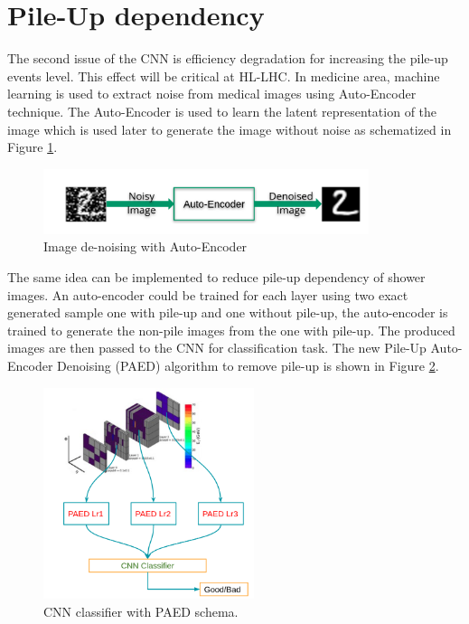 \section{Pile-Up dependency}
The second issue of the CNN is efficiency degradation for increasing the pile-up events level. This effect will be critical at HL-LHC. In medicine area, machine learning is used to extract noise from medical images using Auto-Encoder technique. The Auto-Encoder is used to learn the latent representation of the image which is used later to generate the image without noise as schematized in Figure \ref{fig:Adx3:AutoEncoder}.

\begin{figure}[H]
    \centering
    \includegraphics[width=0.85\textwidth]{Adx/Adx3/Img/AutoEncoder.png}
    \caption{Image de-noising with Auto-Encoder}
    \label{fig:Adx3:AutoEncoder}
\end{figure}

The same idea can be implemented to reduce pile-up dependency of shower images. An auto-encoder could be trained for each layer using two exact generated sample one with pile-up and one without pile-up, the auto-encoder is trained to generate the non-pile images from the one with pile-up. The produced images are then passed to the CNN for classification task. The new Pile-Up Auto-Encoder Denoising (PAED) algorithm to remove pile-up is shown in Figure \ref{fig:Adx3:PAED}.

\begin{figure}[htbp]
    \centering
    \includegraphics[width=0.55\textwidth]{Adx/Adx3/Img/PAED.png}
    \begin{tcolorbox}[colback=black!5!white,colframe=white!75!black]
    \caption{CNN classifier with PAED schema.}
    \label{fig:Adx3:PAED}
    \end{tcolorbox}
    
\end{figure}